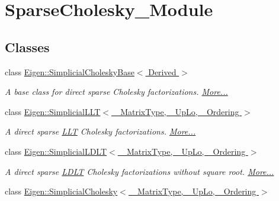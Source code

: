 \hypertarget{group___sparse_cholesky___module}{}\section{Sparse\+Cholesky\+\_\+\+Module}
\label{group___sparse_cholesky___module}
\subsection*{Classes}
\begin{DoxyCompactItemize}
\item 
class \hyperlink{group___sparse_cholesky___module_class_eigen_1_1_simplicial_cholesky_base}{Eigen\+::\+Simplicial\+Cholesky\+Base$<$ Derived $>$}
\begin{DoxyCompactList}\small\item\em A base class for direct sparse Cholesky factorizations.  \hyperlink{group___sparse_cholesky___module_class_eigen_1_1_simplicial_cholesky_base}{More...}\end{DoxyCompactList}\item 
class \hyperlink{group___sparse_cholesky___module_class_eigen_1_1_simplicial_l_l_t}{Eigen\+::\+Simplicial\+L\+L\+T$<$ \+\_\+\+Matrix\+Type, \+\_\+\+Up\+Lo, \+\_\+\+Ordering $>$}
\begin{DoxyCompactList}\small\item\em A direct sparse \hyperlink{group___cholesky___module_class_eigen_1_1_l_l_t}{L\+LT} Cholesky factorizations.  \hyperlink{group___sparse_cholesky___module_class_eigen_1_1_simplicial_l_l_t}{More...}\end{DoxyCompactList}\item 
class \hyperlink{group___sparse_cholesky___module_class_eigen_1_1_simplicial_l_d_l_t}{Eigen\+::\+Simplicial\+L\+D\+L\+T$<$ \+\_\+\+Matrix\+Type, \+\_\+\+Up\+Lo, \+\_\+\+Ordering $>$}
\begin{DoxyCompactList}\small\item\em A direct sparse \hyperlink{group___cholesky___module_class_eigen_1_1_l_d_l_t}{L\+D\+LT} Cholesky factorizations without square root.  \hyperlink{group___sparse_cholesky___module_class_eigen_1_1_simplicial_l_d_l_t}{More...}\end{DoxyCompactList}\item 
class \hyperlink{group___sparse_cholesky___module_class_eigen_1_1_simplicial_cholesky}{Eigen\+::\+Simplicial\+Cholesky$<$ \+\_\+\+Matrix\+Type, \+\_\+\+Up\+Lo, \+\_\+\+Ordering $>$}
\end{DoxyCompactItemize}


